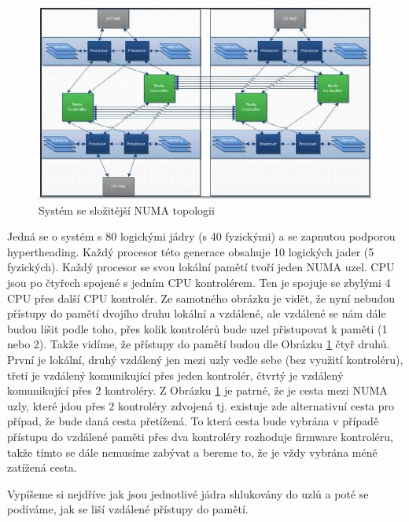 \documentclass[
  master=true,
  font=sans,
  printversion=false,
  joinlists=true,
  figures=true,
  tables=true,
  sourcecodes=false,
  theorems=false,
  bibencoding=utf8,
  language=czech,
  encoding=utf8,
  field=ainfk,
  biblatex,
  glossaries,
  index
]{kidiplom}
\begin{document}
\begin{figure}[ht]
\includegraphics[scale=0.7]{obrazky/numa-scheme-big-system.jpeg}
\caption{Systém se složitější NUMA topologii}
\label{numa scheme2}
\end{figure}


Jedná se o systém s 80 logickými jádry (s 40 fyzickými) a se zapnutou podporou hypertheading. Každý procesor této generace obsahuje 10 logických jader (5 fyzických). Každý procesor se svou lokální pamětí tvoří jeden NUMA uzel. CPU jsou po čtyřech spojené s jedním CPU kontrolérem. Ten je spojuje se zbylými 4 CPU přes další CPU kontrolér. Ze samotného obrázku je vidět, že nyní nebudou přístupy do pamětí dvojího druhu lokální a vzdálené, ale vzdálené se nám dále budou lišit podle toho, přes kolik kontrolérů bude uzel přistupovat k paměti (1 nebo 2). Takže vidíme, že přístupy do pamětí budou dle Obrázku \ref{numa scheme2} čtyř druhů. První je lokální, druhý vzdálený jen mezi uzly vedle sebe (bez využití kontroléru), třetí je vzdálený komunikující přes jeden kontrolér, čtvrtý je vzdálený komunikující přes 2 kontroléry. Z Obrázku \ref{numa scheme2} je patrné, že je cesta mezi NUMA uzly, které jdou přes 2 kontroléry zdvojená tj. existuje zde alternativní cesta pro případ, že bude daná cesta přetížená. To která cesta bude vybrána v případě přístupu do vzdálené paměti přes dva kontroléry rozhoduje firmware kontroléru, takže tímto se dále nemusíme zabývat a bereme to, že je vždy vybrána méně zatížená cesta.

\newpage
Vypíšeme si nejdříve jak jsou jednotlivé jádra shlukovány do uzlů a poté se podíváme, jak se liší vzdálené přístupy do pamětí.
\end{document}
